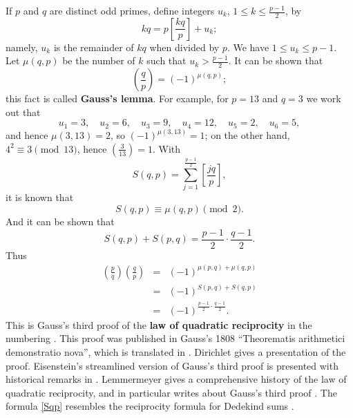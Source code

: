 \documentclass{article}
\begin{document}
If $p$ and $q$ are distinct odd primes, define integers $u_k$, $1 \leq k \leq \frac{p-1}{2}$, by
\[
kq=p \left[ \frac{kq}{p} \right] + u_k;
\]
namely, $u_k$ is the remainder of $kq$ when divided by $p$.
We have $1 \leq u_k \leq p-1$. Let $\mu(q,p)$ be the number of $k$ such that $u_k > \frac{p-1}{2}$. 
It can be shown that
\cite[p.~74, Theorem 92]{wright} 
\[
\left( \frac{q}{p} \right)=(-1)^{\mu(q,p)};
\]
this fact is called \textbf{Gauss's lemma}.
For example, for $p=13$ and $q=3$ we work out that
\[
u_1=3, \quad u_2=6, \quad u_3 = 9, \quad u_4=12, \quad u_5=2, \quad u_6=5,
\]
and hence $\mu(3,13)=2$, so $(-1)^{\mu(3,13)}=1$; on the other hand, $4^2 \equiv 3 \pmod{13}$, hence $\left( \frac{3}{13} \right)=1$.
With
\[
S(q,p)=\sum_{j=1}^{\frac{p-1}{2}} \left[ \frac{jq}{p} \right],
\]
it
is known that  \cite[pp.~77-78, \S 6.13]{wright} 
\[
S(q,p) \equiv \mu(q,p) \pmod{2}.
\]
And it can  be shown that \cite[p.~76, Theorem 100]{wright} 
\begin{equation}
S(q,p)+S(p,q)=\frac{p-1}{2} \cdot \frac{q-1}{2}.
\label{Sqp}
\end{equation}
Thus
\begin{eqnarray*}
\left( \frac{p}{q} \right) \left( \frac{q}{p} \right)&=&(-1)^{\mu(p,q)+\mu(q,p)}\\
&=&(-1)^{S(p,q)+S(q,p)}\\
&=&(-1)^{\frac{p-1}{2} \cdot \frac{q-1}{2}}.
\end{eqnarray*}
This is Gauss's third proof of the \textbf{law of quadratic reciprocity} in the numbering \cite[p.~50, \S 20]{werke}. This proof
was published in Gauss's 1808 ``Theorematis arithmetici demonstratio nova'', which is translated in \cite[pp.~112--118]{smith}.
Dirichlet \cite[pp.~65--72, \S\S 42--44]{dirichlet} gives a presentation of the proof.
Eisenstein's streamlined version of Gauss's third proof is presented with historical remarks in \cite{eisenstein}.
Lemmermeyer \cite{lemmermeyer} gives a comprehensive history of the law of quadratic reciprocity, and in particular writes about Gauss's third proof  \cite[pp.~9--10]{lemmermeyer}.
The formula \eqref{Sqp} resembles the reciprocity formula for Dedekind sums \cite[p.~4, Theorem~1]{rademacher}.
\end{document}
